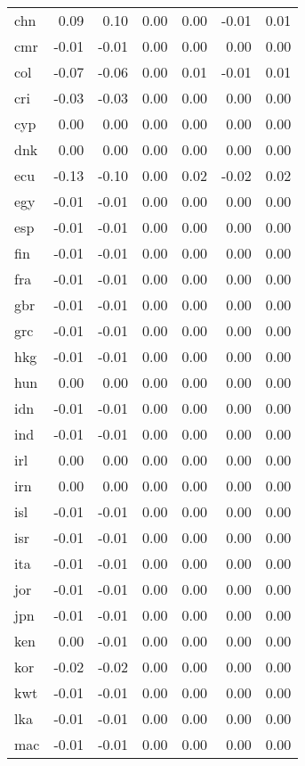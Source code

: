 \documentclass[10pt]{article}
\begin{document}
\begin{longtable}[t]{lrrrrrr}
chn & 0.09 & 0.10 & 0.00 & 0.00 & -0.01 & 0.01\\
cmr & -0.01 & -0.01 & 0.00 & 0.00 & 0.00 & 0.00\\
col & -0.07 & -0.06 & 0.00 & 0.01 & -0.01 & 0.01\\
cri & -0.03 & -0.03 & 0.00 & 0.00 & 0.00 & 0.00\\
\addlinespace
cyp & 0.00 & 0.00 & 0.00 & 0.00 & 0.00 & 0.00\\
dnk & 0.00 & 0.00 & 0.00 & 0.00 & 0.00 & 0.00\\
ecu & -0.13 & -0.10 & 0.00 & 0.02 & -0.02 & 0.02\\
egy & -0.01 & -0.01 & 0.00 & 0.00 & 0.00 & 0.00\\
esp & -0.01 & -0.01 & 0.00 & 0.00 & 0.00 & 0.00\\
\addlinespace
fin & -0.01 & -0.01 & 0.00 & 0.00 & 0.00 & 0.00\\
fra & -0.01 & -0.01 & 0.00 & 0.00 & 0.00 & 0.00\\
gbr & -0.01 & -0.01 & 0.00 & 0.00 & 0.00 & 0.00\\
grc & -0.01 & -0.01 & 0.00 & 0.00 & 0.00 & 0.00\\
hkg & -0.01 & -0.01 & 0.00 & 0.00 & 0.00 & 0.00\\
\addlinespace
hun & 0.00 & 0.00 & 0.00 & 0.00 & 0.00 & 0.00\\
idn & -0.01 & -0.01 & 0.00 & 0.00 & 0.00 & 0.00\\
ind & -0.01 & -0.01 & 0.00 & 0.00 & 0.00 & 0.00\\
irl & 0.00 & 0.00 & 0.00 & 0.00 & 0.00 & 0.00\\
irn & 0.00 & 0.00 & 0.00 & 0.00 & 0.00 & 0.00\\
\addlinespace
isl & -0.01 & -0.01 & 0.00 & 0.00 & 0.00 & 0.00\\
isr & -0.01 & -0.01 & 0.00 & 0.00 & 0.00 & 0.00\\
ita & -0.01 & -0.01 & 0.00 & 0.00 & 0.00 & 0.00\\
jor & -0.01 & -0.01 & 0.00 & 0.00 & 0.00 & 0.00\\
jpn & -0.01 & -0.01 & 0.00 & 0.00 & 0.00 & 0.00\\
\addlinespace
ken & 0.00 & -0.01 & 0.00 & 0.00 & 0.00 & 0.00\\
kor & -0.02 & -0.02 & 0.00 & 0.00 & 0.00 & 0.00\\
kwt & -0.01 & -0.01 & 0.00 & 0.00 & 0.00 & 0.00\\
lka & -0.01 & -0.01 & 0.00 & 0.00 & 0.00 & 0.00\\
mac & -0.01 & -0.01 & 0.00 & 0.00 & 0.00 & 0.00\\

\end{longtable}
\end{document}

